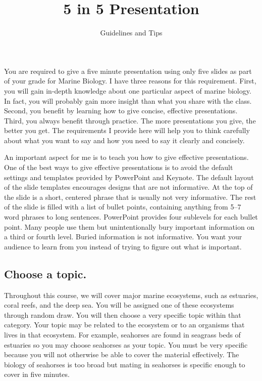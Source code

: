 \documentclass[letterpaper]{memoir}
\title{5 in 5 Presentation}
\author{Guidelines and Tips}
\date{} %
\newcommand{\insertslide}[2]{%
  \framebox{\texttt{[image: \#2]}}
}
\begin{document}
\maketitle	%
{\baselineskip\sidepar{\insertslide{1}{5_in_5_overview.pdf}}}


You are required to give a five minute presentation using only five slides as part of your grade for Marine Biology. I have three reasons for this requirement. First, you will gain in-depth knowledge about one particular aspect of marine biology. In fact, you will probably gain more insight than what you share with the class.  Second, you benefit by learning how to give concise, effective presentations. Third, you always benefit through practice. The more presentations you give, the better you get. The requirements I provide here will help you to think carefully about what you want to say and how you need to say it clearly and concisely.

An important aspect for me is to teach you how to give effective presentations. One of the best ways to give effective presentations is to avoid the default settings and templates provided by PowerPoint and Keynote. The default layout of the slide templates encourages designs that are not informative. At the top of the slide is a short, centered phrase that is usually not very informative. The rest of the slide is filled with a list of bullet points, containing anything from 5--7 word phrases to long sentences. PowerPoint provides four sublevels for each bullet point. Many people use them but unintentionally bury important information on a third or fourth level. Buried information is not informative. You want your audience to learn from you instead of trying to figure out what is important.

\subsection*{Choose a topic.}

\baselineskip\sidepar{\insertslide{2}{5_in_5_overview.pdf}}
Throughout this course, we will cover major marine ecosystems, such as estuaries, coral reefs, and the deep sea.  You will be assigned one of these ecosystems through random draw.  You will then choose a very specific topic within that category. Your topic may be related to the ecosystem or to an organisms that lives in that ecosystem.  For example, seahorses are found in seagrass beds of estuaries so you may choose seahorses as your topic.  You must be very specific because you will not otherwise be able to cover the material effectively. The biology of seahorses is too broad but mating in seahorses is specific enough to cover in five minutes.
\end{document}
